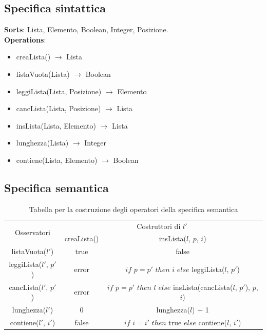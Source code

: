 \documentclass[italian,12pt,a4paper]{article}
\begin{document}
	\subsection{Specifica sintattica}
	
	\textbf{Sorts}: Lista, Elemento, Boolean, Integer, Posizione. \\
	\linebreak
	\textbf{Operations}:
	\begin{itemize}
		\item creaLista() $\rightarrow$ Lista
		\item listaVuota(Lista) $\rightarrow$ Boolean
		\item leggiLista(Lista, Posizione) $\rightarrow$ Elemento
		\item cancLista(Lista, Posizione) $\rightarrow$ Lista
		\item insLista(Lista, Elemento) $\rightarrow$ Lista
		\item lunghezza(Lista) $\rightarrow$ Integer
		\item contiene(Lista, Elemento) $\rightarrow$ Boolean
	\end{itemize}
	
	\subsection{Specifica semantica}
	
	\begin{table}[!ht]
		\centering
		\renewcommand{\arraystretch}{1.5}
		\begin{tabular}{|c|c|c|}
			\hline
			\multirow{2}{*}{Osservatori} & \multicolumn{2}{c|}{Costruttori di $l'$} \\
			\cline{2-3}
			& creaLista() & insLista($l$, $p$, $i$) \\
			\hline
			listaVuota($l'$) & true & false \\
			\hline
			leggiLista($l'$, $p'$) & error & $if$ $p=p'$ $then$ $i$ $else$ leggiLista($l$, $p'$) \\
			\hline
			cancLista($l'$, $p'$) & error & $if$ $p=p'$ $then$ $l$ $else$ insLista(cancLista($l$, $p'$), $p$, $i$) \\
			\hline
			lunghezza($l'$) & 0 & lunghezza($l$) + 1 \\
			\hline
			contiene($l'$, $i'$) & false & $if$ $i=i'$ $then$ true $else$ contiene($l$, $i'$)  \\
			\hline

		\end{tabular}
		\caption{Tabella per la costruzione degli operatori della specifica semantica}
		\label{tab:esempio}
	\end{table}
\end{document}
